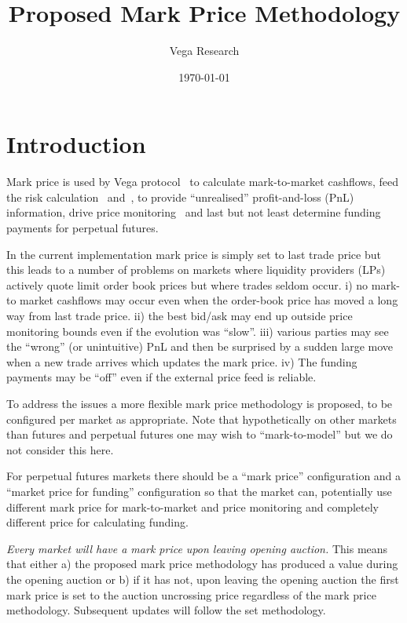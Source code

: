 \documentclass[10pt]{article}
\author{Vega Research}
\title{Proposed Mark Price Methodology}
\date{
    \vspace{2em}
    \today\\
    \vspace{0.5em}
    {\footnotesize }
    \vspace{2em}
}
\begin{document}
\thispagestyle{empty} %
\pagestyle{plain}
\lhead[{}{}]       {{}{}}
\rhead[{}{}]       {{}{}}

\maketitle


\pagestyle{fancyplain}
\rhead{\rightmark}
\cfoot{\thepage}


\section{Introduction}

Mark price is used by Vega protocol~\cite{vega whitepaper} to calculate mark-to-market cashflows, feed the risk calculation~\cite{margins paper} and~\cite{margins spec}, to provide ``unrealised'' profit-and-loss (PnL) information, drive price monitoring~\cite{price monitoring spec} and last but not least determine funding payments for perpetual futures. 

In the current implementation mark price is simply set to last trade price but this leads to a number of problems on markets where liquidity providers (LPs) actively quote limit order book prices but where trades seldom occur. i) no mark-to market cashflows may occur even when the order-book price has moved a long way from last trade price. ii) the best bid/ask may end up outside price monitoring bounds even if the evolution was ``slow''. iii) various parties may see the ``wrong'' (or unintuitive) PnL and then be surprised by a sudden large move when a new trade arrives which updates the mark price. iv) The funding payments may be ``off'' even if the external price feed is reliable. 

To address the issues a more flexible mark price methodology is proposed, to be configured per market as appropriate. 
Note that hypothetically on other markets than futures and perpetual futures one may wish to ``mark-to-model'' but we do not consider this here. 

For perpetual futures markets there should be a ``mark price'' configuration and a ``market price for funding'' configuration so that the market can, potentially use different mark price for mark-to-market and price monitoring and completely different price for calculating funding. 

{\em Every market will have a mark price upon leaving opening auction.} 
This means that either a) the proposed mark price methodology has produced a value during the opening auction or b) if it has not, upon leaving the opening auction the first mark price is set to the auction uncrossing price regardless of the mark price methodology. 
Subsequent updates will follow the set methodology. 
\end{document}
